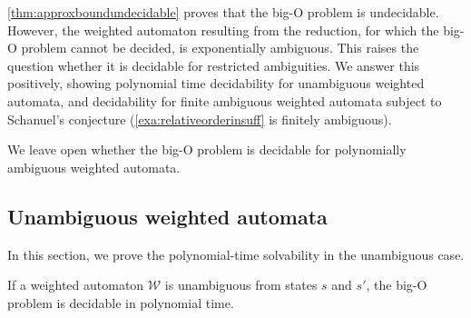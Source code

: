 \documentclass{lmcs}
\theoremstyle{plain}
\theoremstyle{definition}
\theoremstyle{remark}
\newcommand\wa{\mathcal{W}}
\begin{document}
\cref{thm:approxboundundecidable} proves that the big-O problem is undecidable. However, the weighted automaton resulting from the reduction, for which the big-O problem cannot be decided, is exponentially ambiguous. This raises the question whether it is decidable for restricted ambiguities. We answer this positively, showing polynomial time decidability for  unambiguous weighted automata, and decidability for finite ambiguous weighted automata subject to Schanuel's conjecture (\cref{exa:relativeorderinsuff} is finitely ambiguous).

We leave open whether the big-O problem is decidable for polynomially ambiguous weighted automata.

\subsection{Unambiguous weighted automata}

In this section, we prove the polynomial-time solvability in the unambiguous case.

\begin{thm}\label{thm:detpolly}
If a weighted automaton $\wa$ is unambiguous from states $s$ and $s'$, the big-O problem is decidable in polynomial time.
\end{thm}
\end{document}

